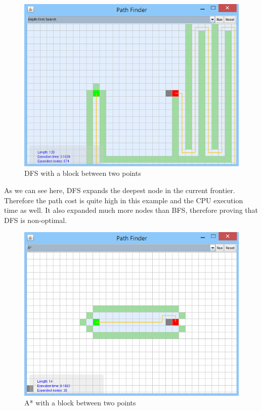 \documentclass[a4paper]{article}
\begin{document}
\begin{figure}[h!]
  \centering
    \includegraphics[scale=.9]{images/dfs1.png}
  \caption{DFS with a block between two points}
\end{figure}

\noindent As we can see here, DFS expands the deepest node in the current frontier. Therefore the path cost is quite high in this example and the CPU execution time as well. It also expanded much more nodes than BFS, therefore proving that DFS is non-optimal. \\

\begin{figure}[h!]
  \centering
    \includegraphics[scale=.9]{images/A1.png}
  \caption{A* with a block between two points}
\end{figure}
\end{document}
